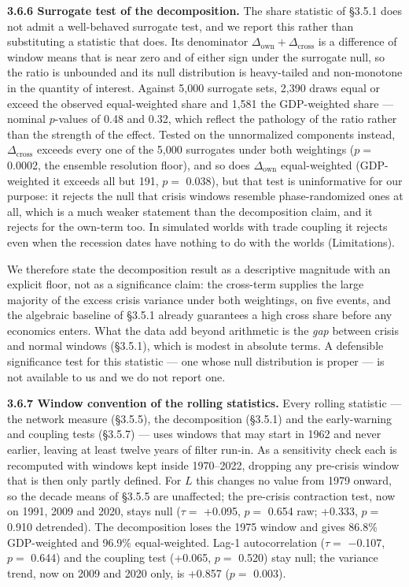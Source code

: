 \documentclass[11pt,a4paper]{article}
\begin{document}
\textbf{3.6.6 Surrogate test of the decomposition.} The share statistic of §3.5.1 does not admit a well-behaved surrogate test, and we report this rather than substituting a statistic that does. Its denominator \(\Delta_{\text{own}} + \Delta_{\text{cross}}\) is a difference of window means that is near zero and of either sign under the surrogate null, so the ratio is unbounded and its null distribution is heavy-tailed and non-monotone in the quantity of interest. Against 5,000 surrogate sets, 2,390 draws equal or exceed the observed equal-weighted share and 1,581 the GDP-weighted share — nominal \(p\)-values of 0.48 and 0.32, which reflect the pathology of the ratio rather than the strength of the effect. Tested on the unnormalized components instead, \(\Delta_{\text{cross}}\) exceeds every one of the 5,000 surrogates under both weightings (\(p =\) 0.0002, the ensemble resolution floor), and so does \(\Delta_{\text{own}}\) equal-weighted (GDP-weighted it exceeds all but 191, \(p =\) 0.038), but that test is uninformative for our purpose: it rejects the null that crisis windows resemble phase-randomized ones at all, which is a much weaker statement than the decomposition claim, and it rejects for the own-term too. In simulated worlds with trade coupling it rejects even when the recession dates have nothing to do with the worlds (Limitations).

We therefore state the decomposition result as a descriptive magnitude with an explicit floor, not as a significance claim: the cross-term supplies the large majority of the excess crisis variance under both weightings, on five events, and the algebraic baseline of §3.5.1 already guarantees a high cross share before any economics enters. What the data add beyond arithmetic is the \emph{gap} between crisis and normal windows (§3.5.1), which is modest in absolute terms. A defensible significance test for this statistic — one whose null distribution is proper — is not available to us and we do not report one.

\textbf{3.6.7 Window convention of the rolling statistics.} Every rolling statistic — the network measure (§3.5.5), the decomposition (§3.5.1) and the early-warning and coupling tests (§3.5.7) — uses windows that may start in 1962 and never earlier, leaving at least twelve years of filter run-in. As a sensitivity check each is recomputed with windows kept inside 1970–2022, dropping any pre-crisis window that is then only partly defined. For \(L\) this changes no value from 1979 onward, so the decade means of §3.5.5 are unaffected; the pre-crisis contraction test, now on 1991, 2009 and 2020, stays null (\(\tau =\) +0.095, \(p =\) 0.654 raw; +0.333, \(p =\) 0.910 detrended). The decomposition loses the 1975 window and gives 86.8\% GDP-weighted and 96.9\% equal-weighted. Lag-1 autocorrelation (\(\tau =\) −0.107, \(p =\) 0.644) and the coupling test (+0.065, \(p =\) 0.520) stay null; the variance trend, now on 2009 and 2020 only, is +0.857 (\(p =\) 0.003).
\end{document}
